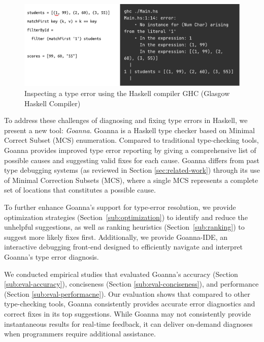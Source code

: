 \documentclass[pdflatex,sn-mathphys-num]{sn-jnl}%
\begin{document}
    \begin{figure}[ht!]
        \centering
        \includegraphics[width=\linewidth]{images/motivation}
        \caption{Inspecting a type error using the Haskell compiler GHC (Glasgow Haskell Compiler)}
        \label{fig:motivation}
    \end{figure}
    To address these challenges of diagnosing and fixing type errors in Haskell, we present a new tool: \textit{Goanna}. Goanna is a Haskell type checker based on Minimal Correct Subset (MCS) enumeration. Compared to traditional type-checking tools, Goanna provides improved type error reporting by giving a comprehensive list of possible causes and suggesting valid fixes for each cause.  Goanna differs from past type debugging systems (as reviewed in Section \ref{sec:related-work}) through its use of Minimal Correction Subsets (MCS), where a single MCS represents a complete set of locations that constitutes a possible cause.

	To further enhance Goanna's support for type-error resolution, we provide optimization strategies (Section~\ref{sub:optimization}) to identify and reduce the unhelpful suggestions, as well as ranking heuristics (Section~\ref{sub:ranking}) to suggest more likely fixes first. Additionally, we provide Goanna-IDE, an interactive debugging front-end designed to efficiently navigate and interpret Goanna's type error diagnosis.

    We conducted empirical studies that evaluated Goanna's accuracy (Section \ref{sub:eval-accuracy}), conciseness (Section \ref{sub:eval-conciseness}), and performance (Section \ref{sub:eval-performacne}). Our evaluation shows that compared to other type-checking tools, Goanna consistently provides accurate error diagnostics and correct fixes in its top suggestions. While Goanna may not consistently provide instantaneous results for real-time feedback, it can deliver on-demand diagnoses when programmers require additional assistance.
    
\end{document}

